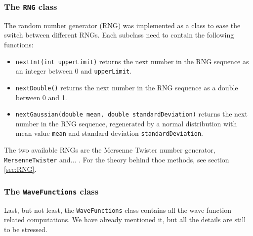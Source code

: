 \subsubsection{The \lstinline{RNG} class}
The random number generator (RNG) was implemented as a class to ease the switch between different RNGs. Each subclass need to contain the following functions:
\begin{itemize}
	\item \lstinline{nextInt(int upperLimit)} returns the next number in the RNG sequence as an integer between 0 and \lstinline{upperLimit}.
	
	\item \lstinline{nextDouble()} returns the next number in the RNG sequence as a double between 0 and 1.
	
	\item \lstinline{nextGaussian(double mean, double standardDeviation)} returns the next number in the RNG sequence, regenerated by a normal distribution with mean value \lstinline{mean} and standard deviation \lstinline{standardDeviation}.
\end{itemize}
The two available RNGs are the Mersenne Twister number generator, \lstinline{MersenneTwister} and... . For the theory behind thoe methods, see section \eqref{sec:RNG}. 

\subsubsection{The \lstinline{WaveFunctions} class}
Last, but not least, the \lstinline{WaveFunctions} class contains all the wave function related computations. We have already mentioned it, but all the details are still to be stressed. 

